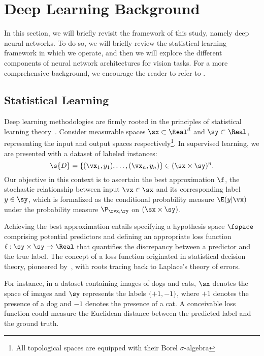 \newcommand{\risk}{\s{R}}
\newcommand{\emprisk}{{\risk_{\text{emp}}}}

\section{Deep Learning Background}
\label{sec:intro:deep_learning}

In this section, we will briefly revisit the framework of this study, namely deep neural networks. To do so, we will briefly review the statistical learning framework in which we operate, and then we will explore the different components of neural network architectures for vision tasks. For a more comprehensive background, we encourage the reader to refer to \cite{goodfellow2016deep}.

\subsection{Statistical Learning}

Deep learning methodologies are firmly rooted in the principles of statistical learning theory~\cite{vapnik1999overview}. Consider measurable spaces $\sx \subset \Real^d$ and $\sy \subset \Real$, representing the input and output spaces respectively\footnote{All topological spaces are equipped with their Borel $\sigma$-algebra}. In supervised learning, we are presented with a dataset of labeled instances:
\[
\s{D} = \{ (\vx_1, y_1), \ldots, (\vx_n, y_n) \} \in (\sx \times \sy)^n.
\]
Our objective in this context is to ascertain the best approximation $\f$, the stochastic relationship between input $\vx \in \sx$ and its corresponding label $y \in \sy$, which is formalized as the conditional probability measure $\E(y | \vx)$ under the probability measure $\P_{\rvx,\ry}$ on $(\sx \times \sy)$.

Achieving the best approximation entails specifying a hypothesis space $\fspace$ comprising potential predictors and defining an appropriate loss function $\ell : \sy \times \sy \to \Real$ that quantifies the discrepancy between a predictor and the true label. The concept of a loss function originated in statistical decision theory, pioneered by~\cite{wald1949statistical}, with roots tracing back to Laplace’s theory of errors.

For instance, in a dataset containing images of dogs and cats, $\sx$ denotes the space of images and $\sy$ represents the labels $\{+1, -1\}$, where $+1$ denotes the presence of a dog and $-1$ denotes the presence of a cat. A conceivable loss function could measure the Euclidean distance between the predicted label and the ground truth.

